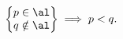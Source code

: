 \begin{lem}
	\label{1.19:lem1}
	\[ \left\{
		\begin{matrix}
			p \in \al\\
			q \notin \al
		\end{matrix}
		\right\}\implies p < q.\]
\end{lem}
